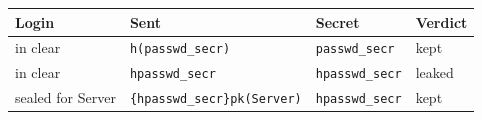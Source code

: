 \begin{tabular}{llll}
\hline
Login & Sent & Secret & Verdict \\
\hline
in clear & \texttt{h(passwd\_secr)} & \texttt{passwd\_secr} & kept \\
in clear & \texttt{hpasswd\_secr} & \texttt{hpasswd\_secr} & leaked \\
sealed for Server & \texttt{\{hpasswd\_secr\}pk(Server)} & \texttt{hpasswd\_secr} & kept \\
\hline
\end{tabular}
